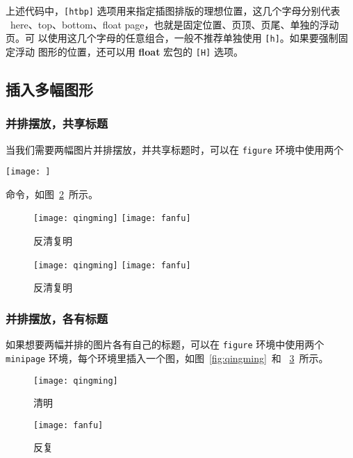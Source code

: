 上述代码中，\verb|[htbp]| 选项用来指定插图排版的理想位置，这几个字母分别代表
~here、top、bottom、float page，也就是固定位置、页顶、页尾、单独的浮动页。可
以使用这几个字母的任意组合，一般不推荐单独使用 \verb|[h]|。如果要强制固定浮动
图形的位置，还可以用 \textbf{float} 宏包的 \verb|[H]| 选项。

\subsection{插入多幅图形}

\subsubsection*{并排摆放，共享标题}

当我们需要两幅图片并排摆放，并共享标题时，可以在 \texttt{figure} 环境中使用两个
\begin{latex}
\texttt{[image: ]}
\end{latex}
命令，如图~\ref{fig:fanqingfuming}~所示。

\begin{latex}
\begin{figure}[htbp]
\centering
\texttt{[image: qingming]}
\hspace{36pt}
\texttt{[image: fanfu]}
\caption{反清复明}
\label{fig:fanqingmuming}
\end{figure}
\end{latex}

\begin{figure}[htbp]
\centering
\texttt{[image: qingming]}
\hspace{36pt}
\texttt{[image: fanfu]}
\caption{反清复明}
\label{fig:fanqingfuming}
\end{figure}

\subsubsection*{并排摆放，各有标题}

如果想要两幅并排的图片各有自己的标题，可以在 \texttt{figure} 环境中使用两个
 \texttt{minipage} 环境，每个环境里插入一个图，如图~\ref{fig:qingming}~和
~\ref{fig:fanfu}~所示。

\begin{latex}
\begin{figure}[htbp]
\centering
\begin{minipage}[t]{0.3\textwidth}
    \centering
    \texttt{[image: qingming]}
    \caption{清明}
    \label{fig:qingming}
\end{minipage}
\hspace{36pt}
\begin{minipage}[t]{0.3\textwidth}
    \centering
    \texttt{[image: fanfu]}
    \caption{反复}
    \label{fig:fanfu}
\end{minipage}
\end{figure}
\end{latex}

